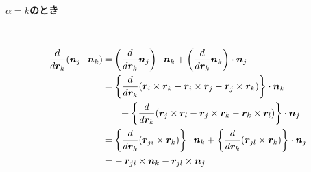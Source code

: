 \paragraph{$\alpha = k$のとき} \
\begin{align}
    \frac{d} {d \bm{r}_{k}} (\bm{n}_{j} \cdot \bm{n}_{k})
 =&
      \left( \frac{d}{d \bm{r}_{k}} \bm{n}_{j} \right) \cdot \bm{n}_{k}
    + \left( \frac{d}{d \bm{r}_{k}} \bm{n}_{k} \right) \cdot \bm{n}_{j}
 \notag
 \\
 =&
    \left\{
            \frac{d} {d \bm{r}_{k}}
            (  \bm{r}_{i} \times \bm{r}_{k}
             - \bm{r}_{i} \times \bm{r}_{j}
             - \bm{r}_{j} \times \bm{r}_{k}
             )
    \right\} \cdot \bm{n}_{k}
 \notag
 \\
 &~~
 + 
    \left\{
            \frac{d} {d \bm{r}_{k}}
           (  \bm{r}_{j} \times \bm{r}_{l}
            - \bm{r}_{j} \times \bm{r}_{k}
            - \bm{r}_{k} \times \bm{r}_{l}
            ) 
   \right\} \cdot \bm{n}_{j}
 \notag
 \\
 =&
   \left\{
          \frac{d}{d \bm{r}_{k}}
          (\bm{r}_{ji} \times \bm{r}_{k})
   \right\} \cdot \bm{n}_{k}
  +
   \left\{
          \frac{d}{d \bm{r}_{k}}
          (\bm{r}_{jl} \times \bm{r}_{k})
   \right\} \cdot \bm{n}_{j}
 \notag
 \\
 =&
   - \bm{r}_{ji} \times \bm{n}_{k} - \bm{r}_{jl} \times \bm{n}_{j}
 \notag
\end{align}

